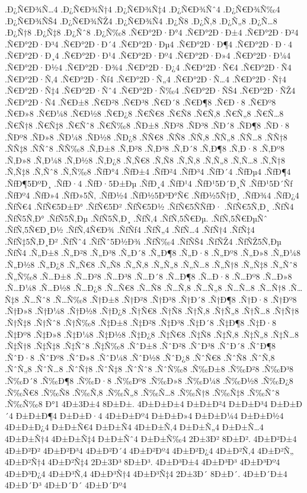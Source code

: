 {.Ð¿Ñ€Ð¾Ñ…4
.Ð¿Ñ€Ð¾Ñ†4
.Ð¿Ñ€Ð¾Ñ‡4
.Ð¿Ñ€Ð¾Ñˆ4
.Ð¿Ñ€Ð¾Ñ‰4
.Ð¿Ñ€Ð¾ÑŠ4
.Ð¿Ñ€Ð¾ÑŽ4
.Ð¿Ñ€Ð¾Ñ4
.Ð¿Ñ8
.Ð¿Ñ‚8
.Ð¿Ñ„8
.Ð¿Ñ…8
.Ð¿Ñ†8
.Ð¿Ñ‡8
.Ð¿Ñˆ8
.Ð¿Ñ‰8
.Ñ€Ð°2Ð·Ð°4
.Ñ€Ð°2Ð·Ð±4
.Ñ€Ð°2Ð·Ð²4
.Ñ€Ð°2Ð·Ð³4
.Ñ€Ð°2Ð·Ð´4
.Ñ€Ð°2Ð·Ðµ4
.Ñ€Ð°2Ð·Ð¶4
.Ñ€Ð°2Ð·Ð·4
.Ñ€Ð°2Ð·Ð¸4
.Ñ€Ð°2Ð·Ð¹4
.Ñ€Ð°2Ð·Ðº4
.Ñ€Ð°2Ð·Ð»4
.Ñ€Ð°2Ð·Ð¼4
.Ñ€Ð°2Ð·Ð½4
.Ñ€Ð°2Ð·Ð¾4
.Ñ€Ð°2Ð·Ð¿4
.Ñ€Ð°2Ð·Ñ€4
.Ñ€Ð°2Ð·Ñ4
.Ñ€Ð°2Ð·Ñ‚4
.Ñ€Ð°2Ð·Ñƒ4
.Ñ€Ð°2Ð·Ñ„4
.Ñ€Ð°2Ð·Ñ…4
.Ñ€Ð°2Ð·Ñ†4
.Ñ€Ð°2Ð·Ñ‡4
.Ñ€Ð°2Ð·Ñˆ4
.Ñ€Ð°2Ð·Ñ‰4
.Ñ€Ð°2Ð·ÑŠ4
.Ñ€Ð°2Ð·ÑŽ4
.Ñ€Ð°2Ð·Ñ4
.Ñ€Ð±8
.Ñ€Ð²8
.Ñ€Ð³8
.Ñ€Ð´8
.Ñ€Ð¶8
.Ñ€Ð·8
.Ñ€Ðº8
.Ñ€Ð»8
.Ñ€Ð¼8
.Ñ€Ð½8
.Ñ€Ð¿8
.Ñ€Ñ€8
.Ñ€Ñ8
.Ñ€Ñ‚8
.Ñ€Ñ„8
.Ñ€Ñ…8
.Ñ€Ñ†8
.Ñ€Ñ‡8
.Ñ€Ñˆ8
.Ñ€Ñ‰8
.ÑÐ±8
.ÑÐ²8
.ÑÐ³8
.ÑÐ´8
.ÑÐ¶8
.ÑÐ·8
.ÑÐº8
.ÑÐ»8
.ÑÐ¼8
.ÑÐ½8
.ÑÐ¿8
.ÑÑ€8
.ÑÑ8
.ÑÑ‚8
.ÑÑ„8
.ÑÑ…8
.ÑÑ†8
.ÑÑ‡8
.ÑÑˆ8
.ÑÑ‰8
.Ñ‚Ð±8
.Ñ‚Ð²8
.Ñ‚Ð³8
.Ñ‚Ð´8
.Ñ‚Ð¶8
.Ñ‚Ð·8
.Ñ‚Ðº8
.Ñ‚Ð»8
.Ñ‚Ð¼8
.Ñ‚Ð½8
.Ñ‚Ð¿8
.Ñ‚Ñ€8
.Ñ‚Ñ8
.Ñ‚Ñ‚8
.Ñ‚Ñ„8
.Ñ‚Ñ…8
.Ñ‚Ñ†8
.Ñ‚Ñ‡8
.Ñ‚Ñˆ8
.Ñ‚Ñ‰8
.ÑƒÐ°4
.ÑƒÐ±4
.ÑƒÐ²4
.ÑƒÐ³4
.ÑƒÐ´4
.ÑƒÐµ4
.ÑƒÐ¶4
.ÑƒÐ¶5ÐºÐ¸
.ÑƒÐ·4
.ÑƒÐ·5Ð±Ðµ
.ÑƒÐ¸4
.ÑƒÐ¹4
.ÑƒÐ¹5Ð´Ð¸Ñ
.ÑƒÐ¹5Ð´Ñƒ
.ÑƒÐº4
.ÑƒÐ»4
.ÑƒÐ»5Ñ‚
.ÑƒÐ½4
.ÑƒÐ½5Ð³Ð°Ñ€
.ÑƒÐ½5Ñ†Ð¸
.ÑƒÐ¾4
.ÑƒÐ¿4
.ÑƒÑ€4
.ÑƒÑ€5Ð±Ð°
.ÑƒÑ€5Ð²
.ÑƒÑ€5Ð½
.ÑƒÑ€5ÑÑƒÐ·
.ÑƒÑ€5Ñ‚Ð¸
.ÑƒÑ4
.ÑƒÑ5Ñ‚Ð°
.ÑƒÑ5Ñ‚Ðµ
.ÑƒÑ5Ñ‚Ð¸
.ÑƒÑ‚4
.ÑƒÑ‚5Ñ€Ðµ.
.ÑƒÑ‚5Ñ€ÐµÑˆ
.ÑƒÑ‚5Ñ€Ð¸Ð½
.ÑƒÑ‚4Ñ€Ð¾
.ÑƒÑƒ4
.ÑƒÑ„4
.ÑƒÑ…4
.ÑƒÑ†4
.ÑƒÑ‡4
.ÑƒÑ‡5Ñ‚Ð¸Ð²
.ÑƒÑˆ4
.ÑƒÑˆ5Ð½Ð¾
.ÑƒÑ‰4
.ÑƒÑŠ4
.ÑƒÑŽ4
.ÑƒÑŽ5Ñ‚Ðµ
.ÑƒÑ4
.Ñ„Ð±8
.Ñ„Ð²8
.Ñ„Ð³8
.Ñ„Ð´8
.Ñ„Ð¶8
.Ñ„Ð·8
.Ñ„Ðº8
.Ñ„Ð»8
.Ñ„Ð¼8
.Ñ„Ð½8
.Ñ„Ð¿8
.Ñ„Ñ€8
.Ñ„Ñ8
.Ñ„Ñ‚8
.Ñ„Ñ„8
.Ñ„Ñ…8
.Ñ„Ñ†8
.Ñ„Ñ‡8
.Ñ„Ñˆ8
.Ñ„Ñ‰8
.Ñ…Ð±8
.Ñ…Ð²8
.Ñ…Ð³8
.Ñ…Ð´8
.Ñ…Ð¶8
.Ñ…Ð·8
.Ñ…Ðº8
.Ñ…Ð»8
.Ñ…Ð¼8
.Ñ…Ð½8
.Ñ…Ð¿8
.Ñ…Ñ€8
.Ñ…Ñ8
.Ñ…Ñ‚8
.Ñ…Ñ„8
.Ñ…Ñ…8
.Ñ…Ñ†8
.Ñ…Ñ‡8
.Ñ…Ñˆ8
.Ñ…Ñ‰8
.Ñ†Ð±8
.Ñ†Ð²8
.Ñ†Ð³8
.Ñ†Ð´8
.Ñ†Ð¶8
.Ñ†Ð·8
.Ñ†Ðº8
.Ñ†Ð»8
.Ñ†Ð¼8
.Ñ†Ð½8
.Ñ†Ð¿8
.Ñ†Ñ€8
.Ñ†Ñ8
.Ñ†Ñ‚8
.Ñ†Ñ„8
.Ñ†Ñ…8
.Ñ†Ñ†8
.Ñ†Ñ‡8
.Ñ†Ñˆ8
.Ñ†Ñ‰8
.Ñ‡Ð±8
.Ñ‡Ð²8
.Ñ‡Ð³8
.Ñ‡Ð´8
.Ñ‡Ð¶8
.Ñ‡Ð·8
.Ñ‡Ðº8
.Ñ‡Ð»8
.Ñ‡Ð¼8
.Ñ‡Ð½8
.Ñ‡Ð¿8
.Ñ‡Ñ€8
.Ñ‡Ñ8
.Ñ‡Ñ‚8
.Ñ‡Ñ„8
.Ñ‡Ñ…8
.Ñ‡Ñ†8
.Ñ‡Ñ‡8
.Ñ‡Ñˆ8
.Ñ‡Ñ‰8
.ÑˆÐ±8
.ÑˆÐ²8
.ÑˆÐ³8
.ÑˆÐ´8
.ÑˆÐ¶8
.ÑˆÐ·8
.ÑˆÐº8
.ÑˆÐ»8
.ÑˆÐ¼8
.ÑˆÐ½8
.ÑˆÐ¿8
.ÑˆÑ€8
.ÑˆÑ8
.ÑˆÑ‚8
.ÑˆÑ„8
.ÑˆÑ…8
.ÑˆÑ†8
.ÑˆÑ‡8
.ÑˆÑˆ8
.ÑˆÑ‰8
.Ñ‰Ð±8
.Ñ‰Ð²8
.Ñ‰Ð³8
.Ñ‰Ð´8
.Ñ‰Ð¶8
.Ñ‰Ð·8
.Ñ‰Ðº8
.Ñ‰Ð»8
.Ñ‰Ð¼8
.Ñ‰Ð½8
.Ñ‰Ð¿8
.Ñ‰Ñ€8
.Ñ‰Ñ8
.Ñ‰Ñ‚8
.Ñ‰Ñ„8
.Ñ‰Ñ…8
.Ñ‰Ñ†8
.Ñ‰Ñ‡8
.Ñ‰Ñˆ8
.Ñ‰Ñ‰8
Ð°1
4Ð±3Ð±4
8Ð±Ð±.
4Ð±Ð±Ð±4
Ð±Ð±Ð²4
Ð±Ð±Ð³4
Ð±Ð±Ð´4
Ð±Ð±Ð¶4
Ð±Ð±Ð·4
4Ð±Ð±Ðº4
Ð±Ð±Ð»4
Ð±Ð±Ð¼4
Ð±Ð±Ð½4
4Ð±Ð±Ð¿4
Ð±Ð±Ñ€4
Ð±Ð±Ñ4
4Ð±Ð±Ñ‚4
Ð±Ð±Ñ„4
Ð±Ð±Ñ…4
4Ð±Ð±Ñ†4
4Ð±Ð±Ñ‡4
Ð±Ð±Ñˆ4
Ð±Ð±Ñ‰4
2Ð±3Ð²
8Ð±Ð².
4Ð±Ð²Ð±4
4Ð±Ð²Ð²
4Ð±Ð²Ð³4
4Ð±Ð²Ð´4
4Ð±Ð²Ðº4
4Ð±Ð²Ð¿4
4Ð±Ð²Ñ‚4
4Ð±Ð²Ñ„
4Ð±Ð²Ñ†4
4Ð±Ð²Ñ‡4
2Ð±3Ð³
8Ð±Ð³.
4Ð±Ð³Ð±4
4Ð±Ð³Ð³
4Ð±Ð³Ðº4
4Ð±Ð³Ð¿4
4Ð±Ð³Ñ‚4
4Ð±Ð³Ñ†4
4Ð±Ð³Ñ‡4
2Ð±3Ð´
8Ð±Ð´.
4Ð±Ð´Ð±4
4Ð±Ð´Ð³
4Ð±Ð´Ð´
4Ð±Ð´Ðº4
}
